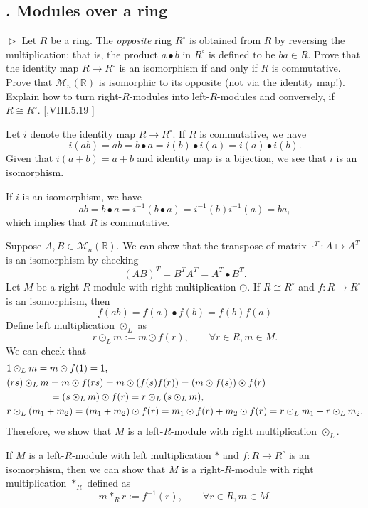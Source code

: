 \documentclass[12pt,letterpaper,boxed]{hmcpset}
\begin{document}
\subsection{. Modules over a ring}
\begin{problem}[5.1]
$\vartriangleright$ Let $R$ be a ring. The \emph{opposite} ring $R^{\circ}$ is obtained from $R$ by reversing the multiplication: that is, the product $a \bullet b$ in $R^{\circ}$ is defined to be $b a \in R .$ Prove that the identity map $R \rightarrow R^{\circ}$ is an isomorphism if and only if $R$ is commutative. Prove that $\mathcal{M}_{n}(\mathbb{R})$ is isomorphic to its opposite (not via the identity map!). Explain how to turn right-$R$-modules into left-$R$-modules and conversely, if $R \cong R^{\circ}$. [,VIII.5.19 ]
\end{problem}
\begin{solution}
	Let $i$ denote the identity map $R \rightarrow R^{\circ}$. If $R$ is commutative, we have
	\[
	i(ab)=ab=b\bullet a=i(b)\bullet i(a)=i(a)\bullet i(b).
	\]
	Given that $i(a+b)=a+b$ and identity map is a bijection, we see that $i$ is an isomorphism.
	
	If $i$ is an isomorphism, we have
	\[
	ab=b\bullet a=i^{-1}(b\bullet a)=i^{-1}(b)i^{-1}(a)=ba,
	\]
	which implies that $R$ is commutative.
	
	Suppose $A,B\in\mathcal{M}_{n}(\mathbb{R})$. We can show that the transpose of matrix $\cdot^T:A\mapsto A^T$ 
	is an isomorphism by checking
	\[
	(AB)^T=B^TA^T=A^T \bullet B^T.
	\]
	Let $M$ be a right-$R$-module with right multiplication $\odot$. If $R \cong R^{\circ}$ and $f:R \rightarrow R^{\circ}$ is an isomorphism, then
	\[
	f(ab)=f(a)\bullet f(b)=f(b)f(a)
	\]
	Define left multiplication $\odot_L$ as
	\[
	r\odot_L m:=m\odot f(r),\qquad\forall r\in R,m\in M.
	\]
	We can check that
	\begin{align*}
		&1\odot_L m=m \odot f(1)=1,\\
		&(rs)\odot_L m=m\odot f(rs)=m\odot (f(s)f(r))=(m\odot f(s))\odot f(r)\\
		&\hspace{4.5em}=(s\odot_L m)\odot f(r)=r\odot_L(s\odot_L m),\\
		&r\odot_L(m_1+m_2)=(m_1+m_2)\odot f(r)=m_1\odot f(r)+m_2\odot f(r)=r\odot_L m_1+r\odot_L m_2.
	\end{align*}
	Therefore, we show that $M$ is a left-$R$-module with right multiplication $\odot_L$.
	
	If $M$ is a left-$R$-module with left multiplication $*$ and $f:R \rightarrow R^{\circ}$ is an isomorphism, then we can show that $M$ is a right-$R$-module with right multiplication $*_R$ defined as
	\[
	m*_R r := f^{-1}(r),\qquad\forall r\in R,m\in M.
	\]
\end{solution}
\end{document}
